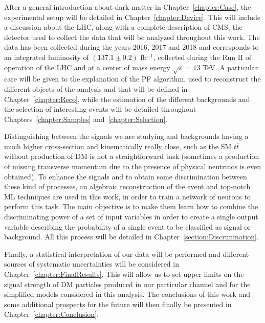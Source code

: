 \documentclass[a4paper, 10pt, openright]{report}
\begin{document}
\newpage

After a general introduction about dark matter in Chapter~\ref{chapter:Case}, the experimental setup will be detailed in Chapter~\ref{chapter:Device}. This will include a discussion about the \ac{LHC}, along with a complete description of \ac{CMS}, the detector used to collect the data that will be analyzed throughout this work. The data has been collected during the years 2016, 2017 and 2018 and corresponds to an integrated luminosity of $(137.1 \pm 0.2)$ fb$^{-1}$, collected during the Run II of operation of the \ac{LHC} and at a center of mass energy $\sqrt{s} = 13$ TeV. A particular care will be given to the explanation of the \acf{PF} algorithm, used to reconstruct the different objects of the analysis and that will be defined in Chapter~\ref{chapter:Reco}, while the estimation of the different backgrounds and the selection of interesting events will be detailed throughout Chapters~\ref{chapter:Samples} and~\ref{chapter:Selection}.

Distinguishing between the signals we are studying and backgrounds having a much higher cross-section and kinematically really close, such as the \ac{SM} $t \bar t$ without production of \ac{DM} is not a straightforward task (sometimes a production of missing transverse momentum due to the presence of physical neutrinos is even obtained). To enhance the signals and to obtain some discrimination between these kind of processes, an algebraic reconstruction of the event and top-notch \ac{ML} techniques are used in this work, in order to train a network of neurons to perform this task. The main objective is to make them learn how to combine the discriminating power of a set of input variables in order to create a single output variable describing the probability of a single event to be classified as signal or background. All this process will be detailed in Chapter~\ref{section:Discrimination}.

Finally, a statistical interpretation of our data will be performed and different sources of systematic uncertainties will be considered in Chapter~\ref{chapter:FinalResults}. This will allow us to set upper limits on the signal strength of \ac{DM} particles produced in our particular channel and for the simplified models considered in this analysis. The conclusions of this work and some additional prospects for the future will then finally be presented in Chapter~\ref{chapter:Conclusion}.


\clearpage
\thispagestyle{empty}
\phantom{a}
\vfill
\newpage
\end{document}

